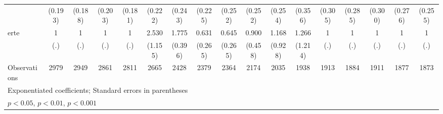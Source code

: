 {\begin{tabular}{l*{16}{c}}
                    &     (0.193)         &     (0.188)         &     (0.203)         &     (0.181)         &     (0.222)         &     (0.243)         &     (0.225)         &     (0.252)         &     (0.252)         &     (0.254)         &     (0.356)         &     (0.305)         &     (0.285)         &     (0.300)         &     (0.276)         &     (0.255)         \\
[1em]
erte                &           1         &           1         &           1         &           1         &       2.530\sym{*}  &       1.775\sym{*}  &       0.631         &       0.645         &       0.900         &       1.168         &       1.266         &           1         &           1         &           1         &           1         &           1         \\
                    &         (.)         &         (.)         &         (.)         &         (.)         &     (1.155)         &     (0.396)         &     (0.265)         &     (0.265)         &     (0.458)         &     (0.928)         &     (1.214)         &         (.)         &         (.)         &         (.)         &         (.)         &         (.)         \\
\hline
Observations        &        2979         &        2949         &        2861         &        2811         &        2665         &        2428         &        2379         &        2364         &        2174         &        2035         &        1938         &        1913         &        1884         &        1911         &        1877         &        1873         \\
\hline\hline
\multicolumn{17}{l}{\footnotesize Exponentiated coefficients; Standard errors in parentheses}\\
\multicolumn{17}{l}{\footnotesize \sym{*} \(p<0.05\), \sym{**} \(p<0.01\), \sym{***} \(p<0.001\)}\\
\end{tabular}
}
